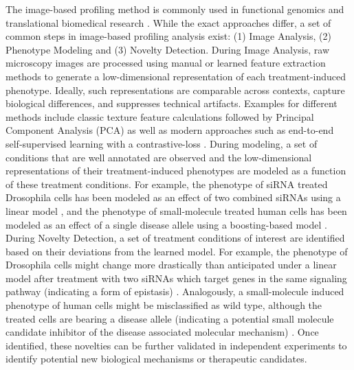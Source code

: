 \begin{flushleft}
The image-based profiling method is commonly used in functional genomics \parencite{lauferMappingGeneticInteractions2013, billmannGeneticInteractionMap2016} and translational biomedical research \parencite{gibsonStrategyIdentifyingRepurposed2015, moshkovPredictingCompoundActivity2023}. While the exact approaches differ, a set of common steps in image-based profiling analysis exist: (1) Image Analysis, (2) Phenotype Modeling and (3) Novelty Detection. During Image Analysis, raw microscopy images are processed using manual or learned feature extraction methods to generate a low-dimensional representation of each treatment-induced phenotype. Ideally, such representations are comparable across contexts, capture biological differences, and suppresses technical artifacts. Examples for different methods include classic texture feature calculations followed by Principal Component Analysis (PCA) \parencite{caicedoDataanalysisStrategiesImagebased2017} as well as modern approaches such as end-to-end self-supervised learning with a contrastive-loss \parencite{perakisContrastiveLearningSingleCell2021}. During modeling, a set of conditions that are well annotated are observed and the low-dimensional representations of their treatment-induced phenotypes are modeled as a function of these treatment conditions. For example, the phenotype of siRNA treated Drosophila cells has been modeled as an effect of two combined siRNAs using a linear model \parencite{billmannGeneticInteractionMap2016}, and the phenotype of small-molecule treated human cells has been modeled as an effect of a single disease allele using a boosting-based model \parencite{gibsonStrategyIdentifyingRepurposed2015}. During Novelty Detection, a set of treatment conditions of interest are identified based on their deviations from the learned model. For example, the phenotype of Drosophila cells might change more drastically than anticipated under a linear model after treatment with two siRNAs which target genes in the same signaling pathway (indicating a form of epistasis) \parencite{billmannGeneticInteractionMap2016}. Analogously, a small-molecule induced phenotype of human cells might be misclassified as wild type, although the treated cells are bearing a disease allele (indicating a potential small molecule candidate inhibitor of the disease associated molecular mechanism) \parencite{gibsonStrategyIdentifyingRepurposed2015}. Once identified, these novelties can be further validated in independent experiments to identify potential new biological mechanisms or therapeutic candidates.
\par


\end{flushleft}
